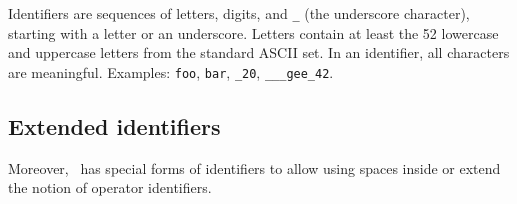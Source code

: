 Identifiers are sequences of letters, digits, and {\tt \_} (the
underscore character), starting with a letter or an underscore.
Letters contain at least the 52 lowercase and uppercase
letters from the standard ASCII set. In an identifier, all characters
are meaningful.
Examples: {\tt foo}, {\tt bar}, {\tt \_20}, {\tt \_\_\_gee\_42}.



\subsection{Extended identifiers}
\label{extended-identifiers}
Moreover, \focal\ has special forms of identifiers to allow using
spaces inside or extend the notion of operator identifiers.
